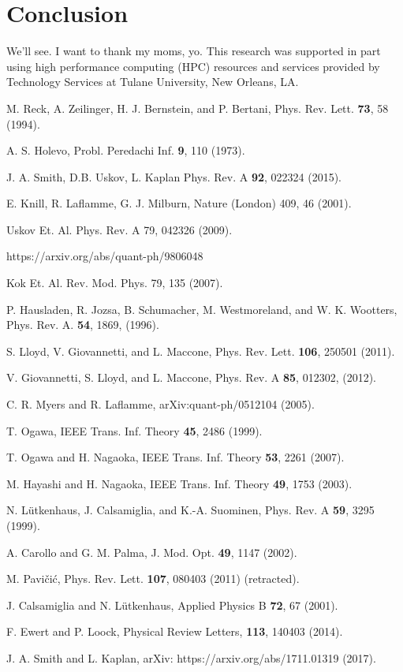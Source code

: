 \documentclass[aps,pra,twocolumn,showpacs,superscriptaddress,floatfix,10pt]{revtex4}
\begin{document}
\section{Conclusion}
We'll see.
\acknowledgments
I want to thank my moms, yo. This research was supported in part using high performance computing (HPC) resources and services provided by Technology Services at Tulane University, New Orleans, LA.
\begin{thebibliography}{99}

 M. Reck, A. Zeilinger, H. J. Bernstein, and P. Bertani, Phys. Rev. Lett. {\bf 73}, 58 (1994).

 A. S. Holevo, Probl. Peredachi Inf. \textbf{9}, 110 (1973).	

 J. A. Smith, D.B. Uskov, L. Kaplan Phys. Rev. A \textbf{92}, 022324 (2015).

  E. Knill, R. Laflamme, G. J. Milburn, Nature (London) 409, 46 (2001).

 Uskov Et. Al.
Phys. Rev. A 79, 042326 (2009).

 https://arxiv.org/abs/quant-ph/9806048

 Kok Et. Al.
Rev. Mod. Phys. 79, 135 (2007).

 P. Hausladen, R. Jozsa, B. Schumacher, M. Westmoreland, and W. K. Wootters, Phys. Rev. A. \textbf{54}, 1869, (1996).

 S. Lloyd, V. Giovannetti, and L. Maccone, Phys. Rev. Lett. \textbf{106}, 250501 (2011).

 V. Giovannetti, S. Lloyd, and L. Maccone, Phys. Rev. A \textbf{85}, 012302, (2012).

 C. R. Myers and R. Laflamme, arXiv:quant-ph/0512104 (2005).

 T. Ogawa, IEEE Trans. Inf. Theory \textbf{45}, 2486 (1999).

 T. Ogawa and H. Nagaoka, IEEE Trans. Inf. Theory \textbf{53}, 2261 (2007).

 M. Hayashi and H. Nagaoka, IEEE Trans. Inf. Theory \textbf{49}, 1753 (2003).

 N. L\"utkenhaus, J. Calsamiglia, and K.-A. Suominen, Phys. Rev. A {\bf 59}, 3295 (1999).

 A. Carollo and G. M. Palma, J. Mod. Opt. {\bf 49}, 1147 (2002).

 M. Pavi\v{c}i\'c, Phys. Rev. Lett. {\bf 107}, 080403 (2011) (retracted).

 J. Calsamiglia and N. L\"utkenhaus, Applied Physics B {\bf 72}, 67 (2001).

 F. Ewert and P. Loock, Physical Review Letters, {\bf 113}, 140403 (2014).

 J. A. Smith and L. Kaplan, arXiv: https://arxiv.org/abs/1711.01319 (2017).

\end{thebibliography}
\end{document}
